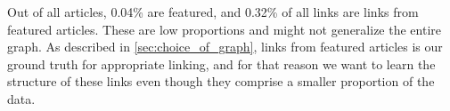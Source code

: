 
Out of all articles, 0.04\% are featured, and 0.32\% of all links are links from featured articles. These are low proportions and might not generalize the entire graph. As described in \cref{sec:choice_of_graph}, links from featured articles is our ground truth for appropriate linking, and for that reason we want to learn the structure of these links even though they comprise a smaller proportion of the data.
